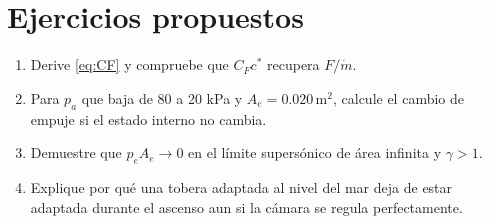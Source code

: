 \section{Ejercicios propuestos}
\begin{enumerate}
\item Derive \eqref{eq:CF} y compruebe que $C_Fc^*$ recupera $F/\dot m$.
\item Para $p_a$ que baja de 80 a 20 kPa y $A_e=0.020\,\mathrm{m^2}$, calcule el cambio de empuje si el estado interno no cambia.
\item Demuestre que $p_eA_e\to0$ en el límite supersónico de área infinita y $\gamma>1$.
\item Explique por qué una tobera adaptada al nivel del mar deja de estar adaptada durante el ascenso aun si la cámara se regula perfectamente.
\end{enumerate}
